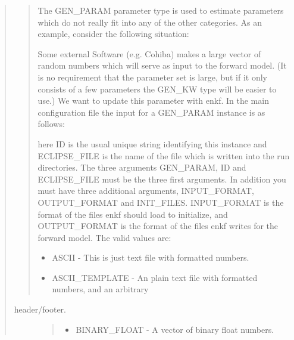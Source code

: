 \documentclass[letterpaper,10pt,english]{sphinxmanual}
\begin{document}
\begin{sphinxShadowBox}
\begin{quote}
\begin{quote}

The GEN\_PARAM parameter type is used to estimate parameters which do not
really fit into any of the other categories. As an example, consider the
following situation:

Some external Software (e.g. Cohiba) makes a large vector of random numbers
which will serve as input to the forward model. (It is no requirement that the
parameter set is large, but if it only consists of a few parameters the GEN\_KW
type will be easier to use.) We want to update this parameter with enkf. In
the main configuration file the input for a GEN\_PARAM instance is as follows:

%
\begin{sphinxVerbatim}[commandchars=\\\{\}]
            
\end{sphinxVerbatim}

here ID is the usual unique string identifying this instance and ECLIPSE\_FILE
is the name of the file which is written into the run directories. The three
arguments GEN\_PARAM, ID and ECLIPSE\_FILE must be the three first arguments. In
addition you must have three additional arguments, INPUT\_FORMAT, OUTPUT\_FORMAT
and INIT\_FILES. INPUT\_FORMAT is the format of the files enkf should load to
initialize, and OUTPUT\_FORMAT is the format of the files enkf writes for the
forward model. The valid values are:
\begin{itemize}
\item {} 
ASCII - This is just text file with formatted numbers.

\item {} 
ASCII\_TEMPLATE - An plain text file with formatted numbers, and an arbitrary

\end{itemize}
\end{quote}
\begin{description}
\item[{header/footer.}] \leavevmode\begin{quote}
\begin{itemize}
\item {} 
BINARY\_FLOAT - A vector of binary float numbers.


\end{itemize}
\end{quote}
\end{description}
\end{quote}
\end{sphinxShadowBox}
\end{document}
